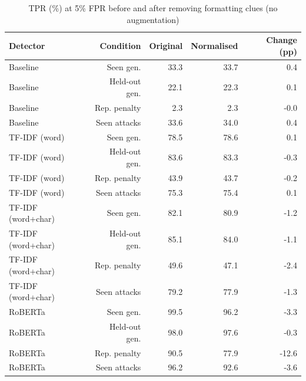 \begin{table}[!t]
\centering
\caption{TPR (\%) at 5\% FPR before and after removing formatting clues (no augmentation)}
\label{tab:normalisation_effect}
\footnotesize
\begin{tabular}{lrrrr}
\toprule
\textbf{Detector} & \textbf{Condition} & \textbf{Original} & \textbf{Normalised} & \textbf{Change (pp)} \\
\midrule
Baseline & Seen gen. & 33.3 & 33.7 & 0.4 \\
Baseline & Held-out gen. & 22.1 & 22.3 & 0.1 \\
Baseline & Rep. penalty & 2.3 & 2.3 & -0.0 \\
Baseline & Seen attacks & 33.6 & 34.0 & 0.4 \\
TF-IDF (word) & Seen gen. & 78.5 & 78.6 & 0.1 \\
TF-IDF (word) & Held-out gen. & 83.6 & 83.3 & -0.3 \\
TF-IDF (word) & Rep. penalty & 43.9 & 43.7 & -0.2 \\
TF-IDF (word) & Seen attacks & 75.3 & 75.4 & 0.1 \\
TF-IDF (word+char) & Seen gen. & 82.1 & 80.9 & -1.2 \\
TF-IDF (word+char) & Held-out gen. & 85.1 & 84.0 & -1.1 \\
TF-IDF (word+char) & Rep. penalty & 49.6 & 47.1 & -2.4 \\
TF-IDF (word+char) & Seen attacks & 79.2 & 77.9 & -1.3 \\
RoBERTa & Seen gen. & 99.5 & 96.2 & -3.3 \\
RoBERTa & Held-out gen. & 98.0 & 97.6 & -0.3 \\
RoBERTa & Rep. penalty & 90.5 & 77.9 & -12.6 \\
RoBERTa & Seen attacks & 96.2 & 92.6 & -3.6 \\
\bottomrule
\end{tabular}
\end{table}
